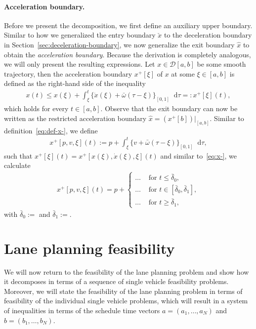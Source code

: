 \documentclass[a4paper]{article}
\theoremstyle{definition}
\theoremstyle{plain}
\newcommand*\diff{\mathop{}\!\mathrm{d}}
\begin{document}
\newpage
{}

\paragraph{Acceleration boundary.}
Before we present the decomposition, we first define an auxiliary upper
boundary.
%
Similar to how we generalized the entry boundary $\check{x}$ to the deceleration
boundary in Section~\ref{sec:deceleration-boundary}, we now generalize the exit
boundary $\hat{x}$ to obtain the \emph{acceleration boundary}.
%
Because the derivation is completely analogous, we will only present the
resulting expressions.
%
Let $x \in \mathcal{D}[a,b]$ be some smooth trajectory, then the acceleration
boundary $x^{+}[\xi]$ of $x$ at some $\xi \in [a,b]$ is defined as the
right-hand side of the inequality
\begin{align}
  x(t) \leq x(\xi) + \int_{\xi}^{t} \{\dot{x}(\xi) + \bar{\omega} (\tau - \xi) \}_{[0,1]} \diff \tau =: x^{+}[\xi](t) ,
\end{align}
which holds for every $t \in [a,b]$.
%
Observe that the exit boundary can now be written as the restricted acceleration
boundary $\hat{x} = (x^{+}[b])|_{[a,b]}$.
%
Similar to definition~\eqref{eq:def-x-}, we define
\begin{align}
  x^{+}[p,v,\xi](t) := p + \int_{\xi}^{t}\{ v + \bar{\omega}(\tau - \xi)\}_{[0,1]} \diff \tau ,
\end{align}
such that $x^{+}[\xi](t) = x^{+}[x(\xi),\dot{x}(\xi),\xi](t)$ and
%
similar to~\eqref{eq:x-}, we calculate
\begin{align}
  x^{+}[p,v,\xi](t) = p +
  \begin{cases}
    \dots &\text{ for } t \leq \bar{\delta}_{0} , \\
    \dots &\text{ for } t \in [\bar{\delta}_{0}, \bar{\delta}_{1} ] , \\
    \dots &\text{ for } t \geq \bar{\delta}_{1} ,
  \end{cases}
\end{align}
with $\bar{\delta}_{0} := $ and $\bar{\delta}_{1} := $.

\newpage
\section{Lane planning feasibility}\label{sec:lane-problem-feasibility}

We will now return to the feasibility of the lane planning problem and show how
it decomposes in terms of a sequence of single vehicle feasibility problems.
%
%
Moreover, we will state the feasibility of the lane planning problem in terms of
feasibility of the individual single vehicle problems, which will result in a
system of inequalities in terms of the schedule time vectors
$a = (a_{1}, \dots, a_{N})$ and $b = (b_{1}, \dots, b_{N})$.
\end{document}
